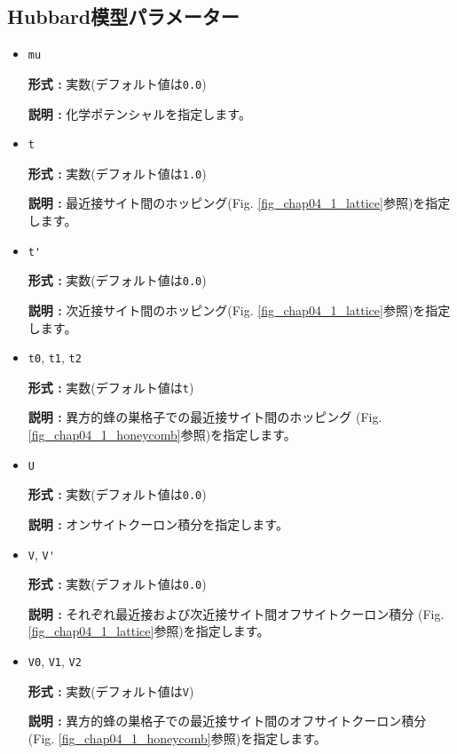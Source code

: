 \subsection{Hubbard模型パラメーター}
\begin{itemize}
\item \verb|mu|

{\bf 形式 :} 実数(デフォルト値は\verb|0.0|)

{\bf 説明 :} 化学ポテンシャルを指定します。

\item \verb|t|

{\bf 形式 :} 実数(デフォルト値は\verb|1.0|)

{\bf 説明 :} 最近接サイト間のホッピング(Fig. \ref{fig_chap04_1_lattice}参照)を指定します。

\item \verb|t'|

{\bf 形式 :} 実数(デフォルト値は\verb|0.0|)

{\bf 説明 :} 次近接サイト間のホッピング(Fig. \ref{fig_chap04_1_lattice}参照)を指定します。

\item \verb|t0|, \verb|t1|, \verb|t2|

{\bf 形式 :} 実数(デフォルト値は\verb|t|)

{\bf 説明 :} 異方的蜂の巣格子での最近接サイト間のホッピング
(Fig. \ref{fig_chap04_1_honeycomb}参照)を指定します。

\item \verb|U|

{\bf 形式 :} 実数(デフォルト値は\verb|0.0|)

{\bf 説明 :} オンサイトクーロン積分を指定します。

\item \verb|V|, \verb|V'|

{\bf 形式 :} 実数(デフォルト値は\verb|0.0|)

{\bf 説明 :} それぞれ最近接および次近接サイト間オフサイトクーロン積分
(Fig. \ref{fig_chap04_1_lattice}参照)を指定します。

\item \verb|V0|, \verb|V1|, \verb|V2|

{\bf 形式 :} 実数(デフォルト値は\verb|V|)

{\bf 説明 :} 異方的蜂の巣格子での最近接サイト間のオフサイトクーロン積分
(Fig. \ref{fig_chap04_1_honeycomb}参照)を指定します。

\end{itemize}

